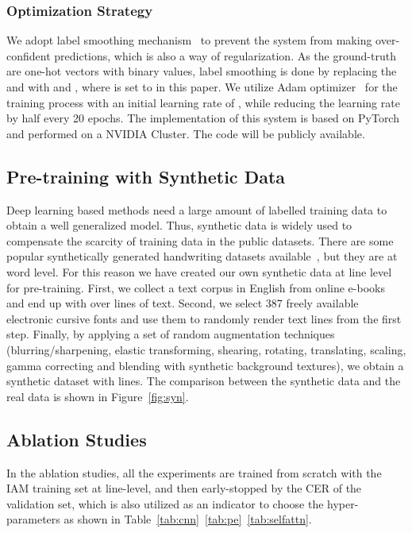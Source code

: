 \documentclass[10pt,twocolumn,letterpaper]{article}
\begin{document}
\subsubsection{Optimization Strategy}
We adopt label smoothing mechanism~\cite{szegedy2016rethinking} to prevent the system from making over-confident predictions, which is also a way of regularization. As the ground-truth are one-hot vectors with binary values, label smoothing is done by replacing the  and  with  and , where  is set to  in this paper. We utilize Adam optimizer~\cite{kingma2014adam} for the training process with an initial learning rate of , while reducing the learning rate by half every 20 epochs. The implementation of this system is based on PyTorch~\cite{paszke2017automatic} and performed on a NVIDIA Cluster. The code will be publicly available.

\subsection{Pre-training with Synthetic Data}
\label{sec:syn}
Deep learning based methods need a large amount of labelled training data to obtain a well generalized model. Thus, synthetic data is widely used to compensate the scarcity of training data in the public datasets. There are some popular synthetically generated handwriting datasets available~\cite{krishnan2016generating,kang2019candidate}, but they are at word level. For this reason we have created our own synthetic data at line level for pre-training. First, we collect a text corpus in English from online e-books and end up with over  lines of text. Second, we select 387 freely available electronic cursive fonts and use them to randomly render text lines from the first step. Finally, by applying a set of random augmentation techniques (blurring/sharpening, elastic transforming, shearing, rotating, translating, scaling, gamma correcting and blending with synthetic background textures), we obtain a synthetic dataset with  lines. The comparison between the synthetic data and the real data is shown in Figure~\ref{fig:syn}.




\subsection{Ablation Studies}
\label{sec:abla}
In the ablation studies, all the experiments are trained from scratch with the IAM training set at line-level, and then early-stopped by the CER of the validation set, which is also utilized as an indicator to choose the hyper-parameters as shown in Table~\ref{tab:cnn}~\ref{tab:pe}~\ref{tab:selfattn}.
\end{document}
